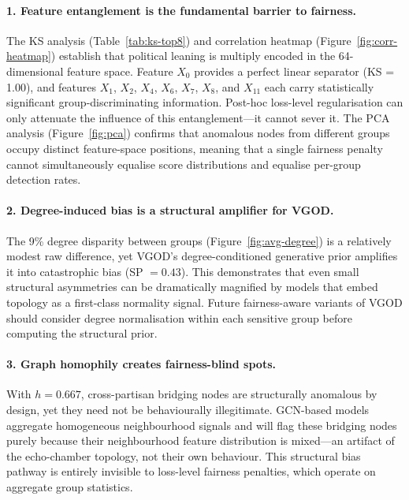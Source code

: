 \documentclass[sigconf,natbib=false]{acmart}
\begin{document}
\paragraph{1. Feature entanglement is the fundamental barrier to fairness.}
The KS analysis (Table~\ref{tab:ks-top8}) and correlation heatmap (Figure~\ref{fig:corr-heatmap}) establish that political leaning is multiply encoded in the 64-dimensional feature space. Feature $X_0$ provides a perfect linear separator (KS = 1.00), and features $X_1$, $X_2$, $X_4$, $X_6$, $X_7$, $X_8$, and $X_{11}$ each carry statistically significant group-discriminating information. Post-hoc loss-level regularisation can only attenuate the influence of this entanglement—it cannot sever it. The PCA analysis (Figure~\ref{fig:pca}) confirms that anomalous nodes from different groups occupy distinct feature-space positions, meaning that a single fairness penalty cannot simultaneously equalise score distributions and equalise per-group detection rates.

\paragraph{2. Degree-induced bias is a structural amplifier for VGOD.}
The 9\% degree disparity between groups (Figure~\ref{fig:avg-degree}) is a relatively modest raw difference, yet VGOD's degree-conditioned generative prior amplifies it into catastrophic bias (SP $= 0.43$). This demonstrates that even small structural asymmetries can be dramatically magnified by models that embed topology as a first-class normality signal. Future fairness-aware variants of VGOD should consider degree normalisation within each sensitive group before computing the structural prior.

\paragraph{3. Graph homophily creates fairness-blind spots.}
With $h = 0.667$, cross-partisan bridging nodes are structurally anomalous by design, yet they need not be behaviourally illegitimate. GCN-based models aggregate homogeneous neighbourhood signals and will flag these bridging nodes purely because their neighbourhood feature distribution is mixed—an artifact of the echo-chamber topology, not their own behaviour. This structural bias pathway is entirely invisible to loss-level fairness penalties, which operate on aggregate group statistics.
\end{document}
